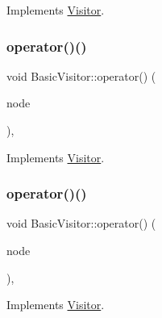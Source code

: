 Implements \hyperlink{struct_visitor_a132fc5e3ff45efb2869272fbe5d5f815}{Visitor}.

\mbox{\label{struct_basic_visitor_a84f04441edb226fd94d8e9db71543410}} 
\subsubsection{\texorpdfstring{operator()()}{operator()()}\hspace{0.1cm}{\footnotesize\ttfamily [22/59]}}
{\footnotesize\ttfamily void Basic\+Visitor\+::operator() (\begin{DoxyParamCaption}\item[{const \hyperlink{struct_function_expression}{Function\+Expression} \&}]{node }\end{DoxyParamCaption})\hspace{0.3cm}{\ttfamily [inline]}, {\ttfamily [virtual]}}



Implements \hyperlink{struct_visitor_a3f6eb67942d7e2c83a761de2bd66a60a}{Visitor}.

\mbox{\label{struct_basic_visitor_aae1410617eb4cfed77871e4b46a7850c}} 
\subsubsection{\texorpdfstring{operator()()}{operator()()}\hspace{0.1cm}{\footnotesize\ttfamily [23/59]}}
{\footnotesize\ttfamily void Basic\+Visitor\+::operator() (\begin{DoxyParamCaption}\item[{const \hyperlink{struct_block}{Block} \&}]{node }\end{DoxyParamCaption})\hspace{0.3cm}{\ttfamily [inline]}, {\ttfamily [virtual]}}



Implements \hyperlink{struct_visitor_a3a26b45c1ab418661f992d97ed9ec9f0}{Visitor}.

\mbox{\label{struct_basic_visitor_aa31748356438cd46ef7cbc49fb8055fa}} 
